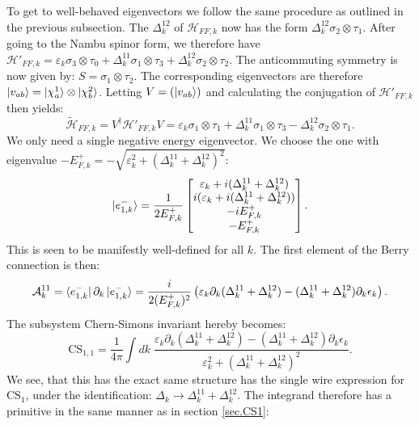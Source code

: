 To get to well-behaved eigenvectors we follow the same procedure as outlined in the previous subsection. The $\Delta^{12}_k$ of $\mathcal{H}_{FF,k}$ now has the form $\Delta^{12}_k \sigma_2 \otimes \tau_1$. After going to the Nambu spinor form, we therefore have $\mathcal{H}'_{FF,k} = \varepsilon_k \sigma_3 \otimes \tau_0 + \Delta^{11}_k \sigma_1 \otimes \tau_3 + \Delta^{12}_k \sigma_2 \otimes \tau_2$. The anticommuting symmetry is now given by: $S = \sigma_1\otimes \tau_2$. The corresponding eigenvectors are therefore $\ket{v_{ab}} = \ket{\chi^{1}_a}\otimes\ket{\chi^{2}_b}$. Letting $V = (\ket{v_{ab}})$ and calculating the conjugation of $\mathcal{H}'_{FF,k}$ then yields:
\begin{equation}
\tilde{\mathcal{H}}_{FF,k} = V^\dagger\mathcal{H}'_{FF,k}V = \varepsilon_k \sigma_1\otimes \tau_1 + \Delta^{11}_k \sigma_1\otimes\tau_3 - \Delta^{12}_k\sigma_2\otimes\tau_1. \nonumber 
\end{equation}
We only need a single negative energy eigenvector. We choose the one with eigenvalue $-E^+_{F,k} = -\sqrt{\varepsilon_k^2 + (\Delta^{11}_k + \Delta^{12}_k)^2}$: 
\begin{equation}
\ket{e^{-}_{1,k}} = \frac{1}{2E^{+}_{F,k}}\begin{bmatrix} \varepsilon_k + i(\Delta^{11}_k + \Delta^{12}_k) \\ i(\varepsilon_k + i(\Delta^{11}_k + \Delta^{12}_k)) \\ -iE^{+}_{F,k} \\ -E^{+}_{F,k} \end{bmatrix}. \nonumber
\end{equation}
This is seen to be manifestly well-defined for all $k$. The first element of the Berry connection is then:
\begin{equation}
\mathcal{A}^{11}_k = \bra{e^{-}_{1,k}}\partial_k\ket{e^{-}_{1,k}} = \frac{i}{2(E^{+}_{F,k})^2}\left(\varepsilon_k\partial_k(\Delta^{11}_k + \Delta^{12}_k) - (\Delta^{11}_k + \Delta^{12}_k)\partial_k \epsilon_k\right). 
\end{equation}
The subsystem Chern-Simons invariant hereby becomes: 
\begin{equation}
\text{CS}_{1,1} = \frac{1}{4\pi}\int dk \; \frac{\varepsilon_k\partial_k(\Delta^{11}_k + \Delta^{12}_k) - (\Delta^{11}_k + \Delta^{12}_k)\partial_k \epsilon_k}{\varepsilon_k^2 + (\Delta^{11}_k + \Delta^{12}_k)^2}. 
\label{eq.CS11integralform}
\end{equation}
We see, that this has the exact same structure has the single wire expression for $\text{CS}_{1}$, under the identification: $\Delta_k \to \Delta^{11}_k + \Delta^{12}_k$. The integrand therefore has a primitive in the same manner as in section \ref{sec.CS1}:
